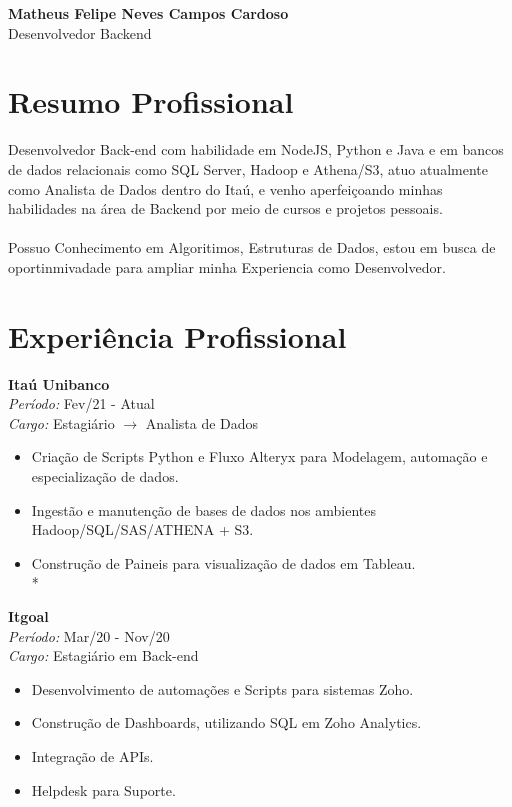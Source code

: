 \documentclass[a4paper,10pt]{article}
\begin{document}
\begin{center}
    \textbf{\LARGE Matheus Felipe Neves Campos Cardoso} \\
    Desenvolvedor Backend 
    \end{center}
\begin{minipage}[t]{0.60\textwidth}
    \section*{\faUser \space Resumo Profissional}
    Desenvolvedor Back-end com habilidade em NodeJS, Python e Java e em bancos de dados relacionais como SQL Server, Hadoop e Athena/S3, atuo atualmente como Analista de Dados dentro do Itaú, e venho aperfeiçoando minhas habilidades na área de Backend por meio de cursos e projetos pessoais.\\\\
    Possuo Conhecimento em Algoritimos, Estruturas de Dados, estou em busca de oportinmivadade para ampliar minha Experiencia como Desenvolvedor.
    
    \section*{\faBriefcase \space Experiência Profissional}
        \textbf{Itaú Unibanco} \\
        \textit{Período:} Fev/21 - Atual \\
        \textit{Cargo:} Estagiário $\rightarrow$ Analista de Dados

        \begin{itemize}[left=0pt]
            \item Criação de Scripts Python e Fluxo Alteryx para Modelagem, automação e especialização de dados.
            \item Ingestão e manutenção de bases de dados nos ambientes Hadoop/SQL/SAS/ATHENA + S3.
            \item Construção de Paineis para visualização de dados em Tableau. \\*
        \end{itemize}

        \textbf{Itgoal} \\
        \textit{Período:} Mar/20 - Nov/20 \\
        \textit{Cargo:} Estagiário em Back-end

        \begin{itemize}[left=0pt]
            \item	Desenvolvimento de automações e Scripts para sistemas Zoho.
            \item	Construção de Dashboards, utilizando SQL em Zoho Analytics.
            \item	Integração de APIs.
            \item	Helpdesk para Suporte.
        \end{itemize}


\end{minipage}
\end{document}
